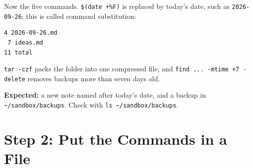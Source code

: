 
Now the five commands. \texttt{\$(date\ +\%F)} is replaced by today's date, such as \texttt{2026-09-26}; this is called command substitution:

\begin{codeblock}

\begin{Shaded}
\begin{Highlighting}[]
 \VariableTok{$(}\VariableTok{)} \OperatorTok{\textgreater{}} \VariableTok{$(}\VariableTok{)}
 \VariableTok{$(}\VariableTok{)}
  
  \PreprocessorTok{*}
\end{Highlighting}
\end{Shaded}

\end{codeblock}

\begin{codeblock}
\begin{Verbatim}[formatcom=\outputstyle]
 4 2026-09-26.md
 7 ideas.md
11 total
\end{Verbatim}
\end{codeblock}

\texttt{tar\ -czf} packs the folder into one compressed file, and \texttt{find\ .}\allowbreak{}\texttt{.}\allowbreak{}\texttt{.}\allowbreak{}\texttt{\ -}\allowbreak{}\texttt{mtime\ +7\ -}\allowbreak{}\texttt{delete} removes backups more than seven days old.

\textbf{Expected:} a new note named after today's date, and a backup in \texttt{\textasciitilde{}/sandbox/backups}. Check with \texttt{ls\ \textasciitilde{}/}\allowbreak{}\texttt{sandbox/}\allowbreak{}\texttt{backups}.


\section{Step 2: Put the Commands in a File}\label{09-lab-automate-a-daily-chore:step-2-put-the-commands-in-a-file}

